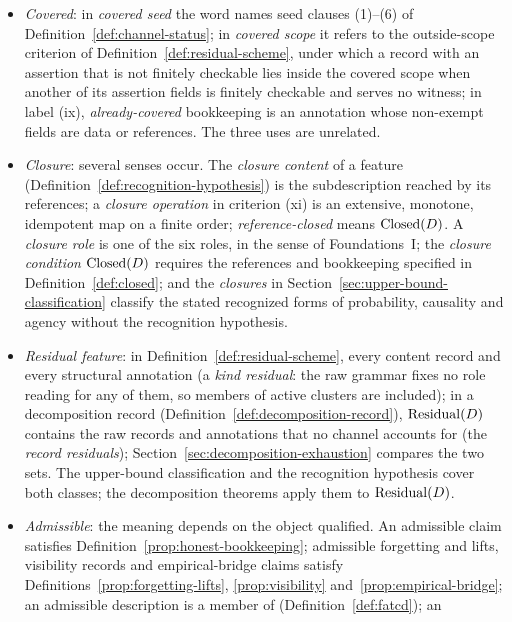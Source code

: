 \begin{itemize}[topsep=2pt,itemsep=1pt]
    predicate of Remark~\ref{rem:recognition-open} does not.
  \item \emph{Covered}: in \emph{covered seed} the word names seed clauses
    (1)--(6) of Definition~\ref{def:channel-status}; in \emph{covered scope}
    it refers to the outside-scope criterion of Definition~\ref{def:residual-scheme}, under which a record with an assertion that is not finitely checkable lies inside the covered scope when another of its assertion fields is finitely checkable and serves no witness; in label (ix), \emph{already-covered}
    bookkeeping is an annotation whose non-exempt fields are data or
    references. The three uses are unrelated.
  \item \emph{Closure}: several senses occur. The \emph{closure content} of a
    feature (Definition~\ref{def:recognition-hypothesis}) is the subdescription
    reached by its references; a \emph{closure operation} in criterion (xi) is an
    extensive, monotone, idempotent map on a finite order; \emph{reference-closed}
    means \(\operatorname{Closed}\!\left(D\right)\). A \emph{closure role} is one
    of the six roles, in the sense of Foundations~I; the \emph{closure
    condition} \(\operatorname{Closed}\!\left(D\right)\) requires the references and bookkeeping
    specified in Definition~\ref{def:closed}; and the \emph{closures} in
    Section~\ref{sec:upper-bound-classification} classify the stated
    recognized forms of probability, causality and agency without the
    recognition hypothesis.
  \item \emph{Residual feature}: in
    Definition~\ref{def:residual-scheme}, every content record and every
    structural annotation (a \emph{kind residual}: the raw grammar fixes no
    role reading for any of them, so members of active clusters are included); in a
    decomposition record (Definition~\ref{def:decomposition-record}),
    \(\operatorname{Residual}\!\left(D\right)\) contains the raw records and annotations that no channel
    accounts for (the \emph{record residuals}); Section~\ref{sec:decomposition-exhaustion}
    compares the two sets. The
    upper-bound classification and the recognition hypothesis cover both
    classes; the decomposition theorems apply them to \(\operatorname{Residual}\!\left(D\right)\).
  \item \emph{Admissible}: the meaning depends on the object qualified. An
    admissible claim satisfies Definition~\ref{prop:honest-bookkeeping};
    admissible forgetting and lifts, visibility records and empirical-bridge
    claims satisfy Definitions~\ref{prop:forgetting-lifts},
    \ref{prop:visibility} and~\ref{prop:empirical-bridge}; an admissible
    description is a member of \FATCD{} (Definition~\ref{def:fatcd}); an

\end{itemize}
